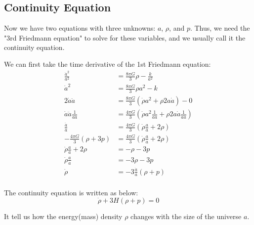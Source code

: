 \clearpage
\subsection{Continuity Equation}
\begin{intuition}
    Now we have two equations with three unknowns: $a$, $\rho$, and $p$. Thus, we need the "3rd Friedmann equation" to solve for these variables, and we usually call it the continuity equation. 
\end{intuition}

\bigskip \noindent
\begin{foundation}
    We can first take the time derivative of the 1st Friedmann equation:
    \begin{align*}
        \frac{\dot{a}^2}{a^2} &= \frac{8\pi G}{3}\rho - \frac{k}{a^2} \\
        \dot{a}^2 &= \frac{8\pi G}{3}\rho a^2 - k \\
        2\dot{a}\ddot{a} &= \frac{8\pi G}{3}(\dot{\rho} a^2 + \rho 2 a \dot{a}) - 0 \\
        \dot{a} \ddot{a} \frac{1}{a \dot{a}} &= \frac{4\pi G}{3}(\dot{\rho} a^2 \frac{1}{a \dot{a}} + \rho 2 a \dot{a} \frac{1}{a \dot{a}}) \\
        \frac{\ddot{a}}{a} &= \frac{4\pi G}{3}(\dot{\rho} \frac{a}{\dot{a}} + 2\rho) \\
        - \frac{4\pi G}{3}(\rho + 3p) &= \frac{4\pi G}{3}(\dot{\rho} \frac{a}{\dot{a}} + 2\rho) \\
        \dot{\rho} \frac{a}{\dot{a}} + 2\rho &= -\rho - 3p \\
        \dot{\rho} \frac{a}{\dot{a}} &= -3\rho - 3p \\
        \dot{\rho} &= - 3\frac{\dot{a}}{a}(\rho + p)\\
    \end{align*}
\end{foundation}

\bigskip \noindent
\begin{theory}
    The continuity equation is written as below:
    \[
        \dot{\rho} + 3H(\rho + p) = 0
    \]

    It tell us how the energy(mass) density $\rho$ changes with the size of the universe $a$.
\end{theory}

